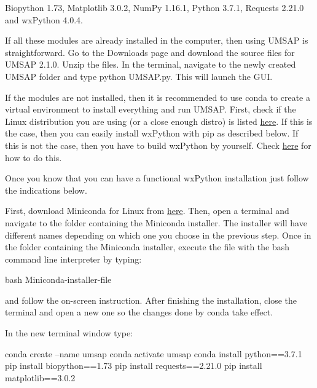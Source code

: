 Biopython \num{1.73}, Matplotlib \num[parse-numbers=false]{3.0.2}, NumPy \num[parse-numbers=false]{1.16.1}, Python \num[parse-numbers=false]{3.7.1}, Requests \num[parse-numbers=false]{2.21.0} and wxPython \num[parse-numbers=false]{4.0.4}.

If all these modules are already installed in the computer, then using UMSAP is straightforward. Go to the Downloads page and download the source files for UMSAP \num[parse-numbers=false]{2.1.0}.  Unzip the files. In the terminal, navigate to the newly created UMSAP folder and type python UMSAP.py. This will launch the GUI.

If the modules are not installed, then it is recommended to use conda to create a virtual environment to install everything and run UMSAP. First, check if the Linux distribution you are using (or a close enough distro) is listed \href{https://extras.wxpython.org/wxPython4/extras/linux/}{here}. If this is the case, then you can easily install wxPython with pip as described below. If this is not the case, then you have to build wxPython by yourself. Check \href{https://wxpython.org/blog/2017-08-17-builds-for-linux-with-pip/index.html}{here} for how to do this.

Once you know that you can have a functional wxPython installation just follow the indications below.

First, download Miniconda for Linux from \href{https://docs.conda.io/en/latest/miniconda.html}{here}. Then, open a terminal and navigate to the folder containing the Miniconda installer. The installer will have different names depending on which one you choose in the previous step. Once in the folder containing the Miniconda installer, execute the file with the bash command line interpreter by typing:

bash Miniconda-installer-file

and follow the on-screen instruction. After finishing the installation, close the terminal and open a new one so the changes done by conda take effect.

In the new terminal window type:

conda create --name umsap
\newline
conda activate umsap
\newline
conda install python==3.7.1
\newline
pip install biopython==1.73
\newline
pip install requests==2.21.0
\newline
pip install matplotlib==3.0.2

